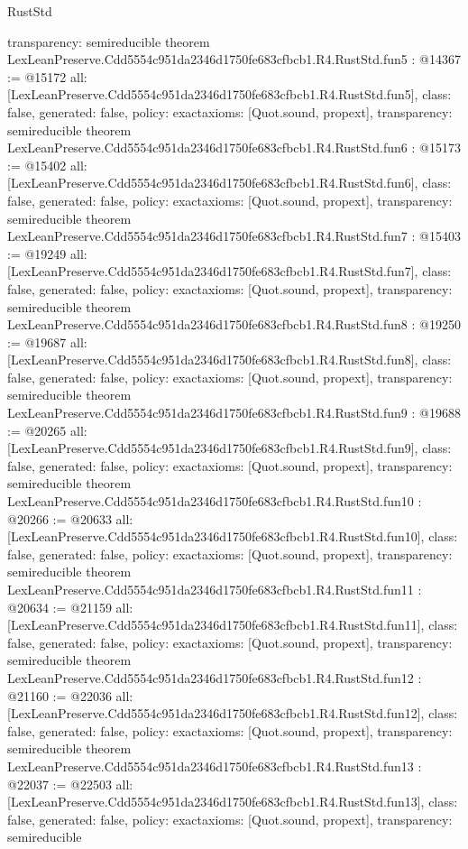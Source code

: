 \begin{lexlean}{RustStd}
\begin{coremodule}
{  transparency: semireducible
}
theorem LexLeanPreserve.Cdd5554c951da2346d1750fe683cfbcb1.R4.RustStd.fun5 : @14367 := @15172 {
  all: [LexLeanPreserve.Cdd5554c951da2346d1750fe683cfbcb1.R4.RustStd.fun5],
  class: false,
  generated: false,
  policy: exact{axioms: [Quot.sound, propext]},
  transparency: semireducible
}
theorem LexLeanPreserve.Cdd5554c951da2346d1750fe683cfbcb1.R4.RustStd.fun6 : @15173 := @15402 {
  all: [LexLeanPreserve.Cdd5554c951da2346d1750fe683cfbcb1.R4.RustStd.fun6],
  class: false,
  generated: false,
  policy: exact{axioms: [Quot.sound, propext]},
  transparency: semireducible
}
theorem LexLeanPreserve.Cdd5554c951da2346d1750fe683cfbcb1.R4.RustStd.fun7 : @15403 := @19249 {
  all: [LexLeanPreserve.Cdd5554c951da2346d1750fe683cfbcb1.R4.RustStd.fun7],
  class: false,
  generated: false,
  policy: exact{axioms: [Quot.sound, propext]},
  transparency: semireducible
}
theorem LexLeanPreserve.Cdd5554c951da2346d1750fe683cfbcb1.R4.RustStd.fun8 : @19250 := @19687 {
  all: [LexLeanPreserve.Cdd5554c951da2346d1750fe683cfbcb1.R4.RustStd.fun8],
  class: false,
  generated: false,
  policy: exact{axioms: [Quot.sound, propext]},
  transparency: semireducible
}
theorem LexLeanPreserve.Cdd5554c951da2346d1750fe683cfbcb1.R4.RustStd.fun9 : @19688 := @20265 {
  all: [LexLeanPreserve.Cdd5554c951da2346d1750fe683cfbcb1.R4.RustStd.fun9],
  class: false,
  generated: false,
  policy: exact{axioms: [Quot.sound, propext]},
  transparency: semireducible
}
theorem LexLeanPreserve.Cdd5554c951da2346d1750fe683cfbcb1.R4.RustStd.fun10 : @20266 := @20633 {
  all: [LexLeanPreserve.Cdd5554c951da2346d1750fe683cfbcb1.R4.RustStd.fun10],
  class: false,
  generated: false,
  policy: exact{axioms: [Quot.sound, propext]},
  transparency: semireducible
}
theorem LexLeanPreserve.Cdd5554c951da2346d1750fe683cfbcb1.R4.RustStd.fun11 : @20634 := @21159 {
  all: [LexLeanPreserve.Cdd5554c951da2346d1750fe683cfbcb1.R4.RustStd.fun11],
  class: false,
  generated: false,
  policy: exact{axioms: [Quot.sound, propext]},
  transparency: semireducible
}
theorem LexLeanPreserve.Cdd5554c951da2346d1750fe683cfbcb1.R4.RustStd.fun12 : @21160 := @22036 {
  all: [LexLeanPreserve.Cdd5554c951da2346d1750fe683cfbcb1.R4.RustStd.fun12],
  class: false,
  generated: false,
  policy: exact{axioms: [Quot.sound, propext]},
  transparency: semireducible
}
theorem LexLeanPreserve.Cdd5554c951da2346d1750fe683cfbcb1.R4.RustStd.fun13 : @22037 := @22503 {
  all: [LexLeanPreserve.Cdd5554c951da2346d1750fe683cfbcb1.R4.RustStd.fun13],
  class: false,
  generated: false,
  policy: exact{axioms: [Quot.sound, propext]},
  transparency: semireducible
}
\end{coremodule}
\end{lexlean}

